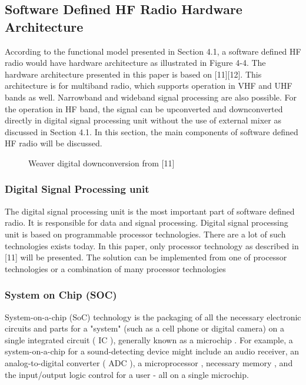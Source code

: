 \documentclass[conference]{IEEEtran}
\begin{document}
\subsection{Software Defined HF Radio Hardware Architecture }
According to the functional model presented in Section 4.1, a software defined HF radio would have hardware architecture as illustrated in Figure 4-4. The hardware architecture presented in this paper is based on [11][12]. This architecture is for multiband radio, which supports operation in VHF and UHF bands as well. Narrowband and wideband signal processing are also possible. For the operation in HF band, the signal can be upconverted and downconverted directly in digital signal processing unit without the use of external mixer as discussed in Section 4.1. In this section, the main components of software defined HF radio will be discussed.
\begin{figure}[h!]
	\centering
	\caption{Weaver digital downconversion from [11]}
	\label{fig:downconversion}
\end{figure} 
\subsubsection{Digital Signal Processing unit}
The digital signal processing unit is the most important part of software defined radio. It is responsible for data and signal processing. Digital signal processing unit is based on programmable processor technologies. There are a lot of such technologies exists today. In this paper, only processor technology as described in [11] will be presented. The solution can be implemented from one of processor technologies or a combination of many processor technologies 
\subsubsection{System on Chip (SOC)}
System-on-a-chip (SoC) technology is the packaging of all the necessary electronic circuits and parts for a "system" (such as a cell phone or digital camera) on a single integrated circuit ( IC ), generally known as a microchip . For example, a system-on-a-chip for a sound-detecting device might include an audio receiver, an analog-to-digital converter ( ADC ), a microprocessor , necessary memory , and the input/output logic control for a user - all on a single microchip.
\end{document}
